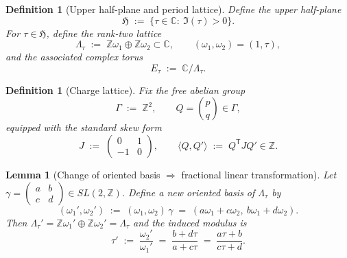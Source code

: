 \documentclass[11pt]{article}
\newtheorem{lemma}[theorem]{Lemma}
\newtheorem{definition}[theorem]{Definition}
\theoremstyle{remark}
\begin{document}
\begin{definition}[Upper half-plane and period lattice]
Define the upper half-plane
\begin{equation}
\mathfrak H \;:=\;\{\tau\in\mathbb C:\ \Im(\tau)>0\}.
\end{equation}
For $\tau\in\mathfrak H$, define the rank-two lattice
\begin{equation}
\Lambda_{\tau}\;:=\;\mathbb Z\omega_{1}\oplus \mathbb Z\omega_{2}\subset\mathbb C,
\qquad
(\omega_{1},\omega_{2})=(1,\tau),
\end{equation}
and the associated complex torus
\begin{equation}
E_{\tau}\;:=\;\mathbb C/\Lambda_{\tau}.
\end{equation}
\end{definition}

\begin{definition}[Charge lattice]
Fix the free abelian group
\begin{equation}
\Gamma \;:=\;\mathbb Z^{2},\qquad Q=\binom{p}{q}\in\Gamma,
\end{equation}
equipped with the standard skew form
\begin{equation}
J \;:=\;\begin{pmatrix}0&1\\-1&0\end{pmatrix},
\qquad
\langle Q,Q'\rangle \;:=\; Q^{\mathsf T}JQ'\in\mathbb Z.
\label{C:Jpairing}
\end{equation}
\end{definition}

\begin{lemma}[Change of oriented basis $\Rightarrow$ fractional linear transformation]
\label{C:SL_action_tau}
Let $\gamma=\begin{pmatrix}a&b\\ c&d\end{pmatrix}\in SL(2,\mathbb Z)$.
Define a new oriented basis of $\Lambda_{\tau}$ by
\begin{equation}
(\omega_{1}',\omega_{2}') \;:=\;(\omega_{1},\omega_{2})\,\gamma
\;=\;(a\omega_{1}+c\omega_{2},\ b\omega_{1}+d\omega_{2}).
\end{equation}
Then $\Lambda_{\tau}'=\mathbb Z\omega_{1}'\oplus\mathbb Z\omega_{2}'=\Lambda_{\tau}$ and the induced modulus is
\begin{equation}
\tau' \;:=\;\frac{\omega_{2}'}{\omega_{1}'}
\;=\;\frac{b+d\tau}{a+c\tau}
\;=\;\frac{a\tau+b}{c\tau+d}.
\label{C:tau_SL}
\end{equation}
\end{lemma}
\end{document}
